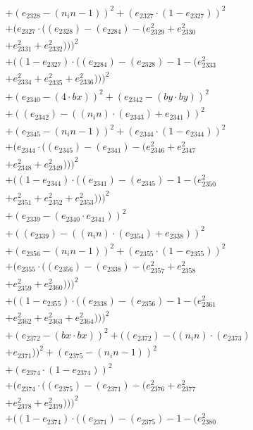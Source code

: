 \documentclass[10pt, a4paper]{article}
\begin{document}
\begin{small}
\begin{align*}
& + (e_{2328} - (n_in - 1))^{2} + (e_{2327}  \cdot  (1 - e_{2327}))^{2} \\
& + (e_{2327}  \cdot  ((e_{2328}) - (e_{2284}) - (e_{2329}^{2} + e_{2330}^{2} \\
& + e_{2331}^{2} + e_{2332}^{2})))^{2} \\
& + ((1 - e_{2327})  \cdot  ((e_{2284}) - (e_{2328}) - 1 - (e_{2333}^{2} \\
& + e_{2334}^{2} + e_{2335}^{2} + e_{2336}^{2})))^{2} \\
& + (e_{2340} - (4  \cdot  bx))^{2} + (e_{2342} - (by  \cdot  by))^{2} \\
& + ((e_{2342}) - ((n_in)  \cdot  (e_{2343}) + e_{2341}))^{2} \\
& + (e_{2345} - (n_in - 1))^{2} + (e_{2344}  \cdot  (1 - e_{2344}))^{2} \\
& + (e_{2344}  \cdot  ((e_{2345}) - (e_{2341}) - (e_{2346}^{2} + e_{2347}^{2} \\
& + e_{2348}^{2} + e_{2349}^{2})))^{2} \\
& + ((1 - e_{2344})  \cdot  ((e_{2341}) - (e_{2345}) - 1 - (e_{2350}^{2} \\
& + e_{2351}^{2} + e_{2352}^{2} + e_{2353}^{2})))^{2} \\
& + (e_{2339} - (e_{2340}  \cdot  e_{2341}))^{2} \\
& + ((e_{2339}) - ((n_in)  \cdot  (e_{2354}) + e_{2338}))^{2} \\
& + (e_{2356} - (n_in - 1))^{2} + (e_{2355}  \cdot  (1 - e_{2355}))^{2} \\
& + (e_{2355}  \cdot  ((e_{2356}) - (e_{2338}) - (e_{2357}^{2} + e_{2358}^{2} \\
& + e_{2359}^{2} + e_{2360}^{2})))^{2} \\
& + ((1 - e_{2355})  \cdot  ((e_{2338}) - (e_{2356}) - 1 - (e_{2361}^{2} \\
& + e_{2362}^{2} + e_{2363}^{2} + e_{2364}^{2})))^{2} \\
& + (e_{2372} - (bx  \cdot  bx))^{2} + ((e_{2372}) - ((n_in)  \cdot  (e_{2373}) \\
& + e_{2371}))^{2} + (e_{2375} - (n_in - 1))^{2} \\
& + (e_{2374}  \cdot  (1 - e_{2374}))^{2} \\
& + (e_{2374}  \cdot  ((e_{2375}) - (e_{2371}) - (e_{2376}^{2} + e_{2377}^{2} \\
& + e_{2378}^{2} + e_{2379}^{2})))^{2} \\
& + ((1 - e_{2374})  \cdot  ((e_{2371}) - (e_{2375}) - 1 - (e_{2380}^{2} \\

\end{align*}
\end{small}
\end{document}
